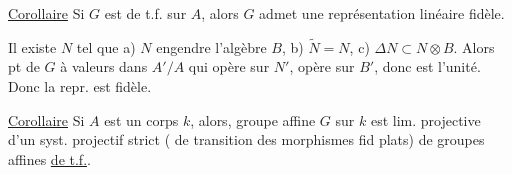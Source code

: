 \uline{Corollaire} Si  $G$ est de t.f. sur $A$, alors $G$ admet une représentation linéaire fidèle.

Il existe $N$ tel que a) $N$ engendre l'algèbre $B$, b) $\tilde N=N$, c) $\Delta N\subset N\otimes B$.  Alors   pt de $G$ à valeurs dans $A'/A$ qui opère  sur $N'$, opère  sur $B'$,  donc est  l'unité. Donc la repr. est fidèle.

\uline{Corollaire} Si $A$ est un corps $k$, alors,  groupe affine  $G$ sur $k$ est lim.  projective d'un syst. projectif strict ( de transition des morphismes fid plats) de groupes affines \uline{de t.f.}.
